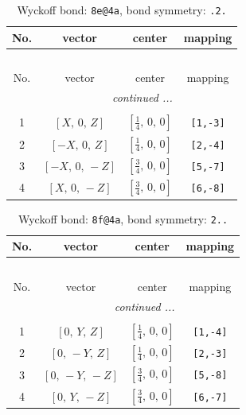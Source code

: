 \documentclass[fleqn,8pt]{jsarticle}
\begin{document}
\renewcommand{\arraystretch}{1.2}
\begin{longtable}{cccc}
\caption{Wyckoff bond: {\tt 8e@4a}, bond symmetry: {\tt .2.}}
 \\
 \hline \hline
No. & vector & center & mapping \\ \hline \endfirsthead

\multicolumn{3}{l}{\tablename\ \thetable{}} \\
 \hline \hline
No. & vector & center & mapping \\ \hline \endhead

 \hline \hline
\multicolumn{3}{r}{\footnotesize\it continued ...} \\ \endfoot

 \hline \hline
\multicolumn{3}{r}{} \\ \endlastfoot

1 & $\left[ X,\, 0,\, Z \right]$ & $\left[ \frac{1}{4},\, 0,\, 0 \right]$ & {\tt [1,-3]} \\ \hline
2 & $\left[ - X,\, 0,\, Z \right]$ & $\left[ \frac{1}{4},\, 0,\, 0 \right]$ & {\tt [2,-4]} \\ \hline
3 & $\left[ - X,\, 0,\, - Z \right]$ & $\left[ \frac{3}{4},\, 0,\, 0 \right]$ & {\tt [5,-7]} \\ \hline
4 & $\left[ X,\, 0,\, - Z \right]$ & $\left[ \frac{3}{4},\, 0,\, 0 \right]$ & {\tt [6,-8]} \\
\end{longtable}
\renewcommand{\arraystretch}{1.2}
\begin{longtable}{cccc}
\caption{Wyckoff bond: {\tt 8f@4a}, bond symmetry: {\tt 2..}}
 \\
 \hline \hline
No. & vector & center & mapping \\ \hline \endfirsthead

\multicolumn{3}{l}{\tablename\ \thetable{}} \\
 \hline \hline
No. & vector & center & mapping \\ \hline \endhead

 \hline \hline
\multicolumn{3}{r}{\footnotesize\it continued ...} \\ \endfoot

 \hline \hline
\multicolumn{3}{r}{} \\ \endlastfoot

1 & $\left[ 0,\, Y,\, Z \right]$ & $\left[ \frac{1}{4},\, 0,\, 0 \right]$ & {\tt [1,-4]} \\ \hline
2 & $\left[ 0,\, - Y,\, Z \right]$ & $\left[ \frac{1}{4},\, 0,\, 0 \right]$ & {\tt [2,-3]} \\ \hline
3 & $\left[ 0,\, - Y,\, - Z \right]$ & $\left[ \frac{3}{4},\, 0,\, 0 \right]$ & {\tt [5,-8]} \\ \hline
4 & $\left[ 0,\, Y,\, - Z \right]$ & $\left[ \frac{3}{4},\, 0,\, 0 \right]$ & {\tt [6,-7]} \\
\end{longtable}
\end{document}
